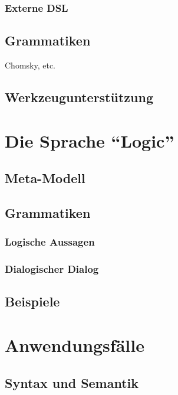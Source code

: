 \documentclass[11pt,a4paper,bibtotocnumbered]{scrreprt}
\begin{document}
\subsection{Externe DSL}

\section{Grammatiken} %
Chomsky, etc.

\section{Werkzeugunterstützung} %

\chapter{Die Sprache \enquote{Logic}} %

\section{Meta-Modell}

\section{Grammatiken}

\subsection{Logische Aussagen}

\subsection{Dialogischer Dialog} %

\section{Beispiele}


\chapter{Anwendungsfälle} %

\section{Syntax und Semantik} %
\end{document}
